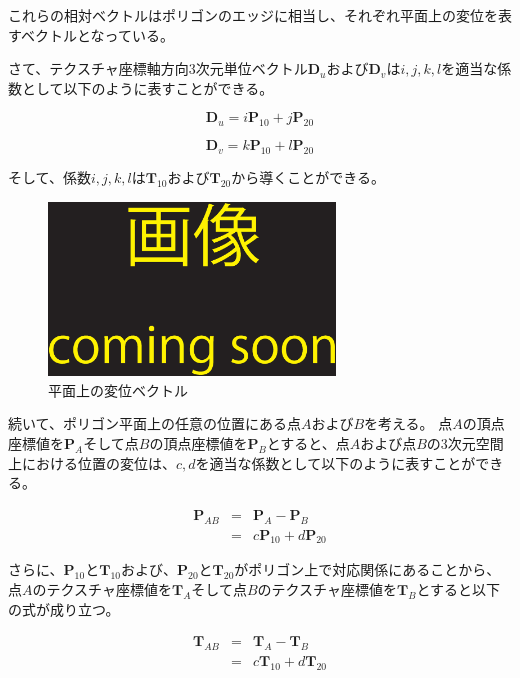 \noindent
これらの相対ベクトルはポリゴンのエッジに相当し、それぞれ平面上の変位を表すベクトルとなっている。

さて、テクスチャ座標軸方向3次元単位ベクトル$\bm{D}_u$および$\bm{D}_v$は$i,j,k,l$を適当な係数として以下のように表すことができる。

\begin{equation}
\bm{D}_u = i\bm{P}_{10} + j\bm{P}_{20}
\label{EUp}
\end{equation}

\begin{equation}
\bm{D}_v = k\bm{P}_{10} + l\bm{P}_{20}
\label{EVp}
\end{equation}

\noindent
そして、係数$i,j,k,l$は$\bm{T}_{10}$および$\bm{T}_{20}$から導くことができる。


\begin{figure}[h]
  \centering
  \includegraphics[width=3.0in]{./img/TEMP}
  \caption{平面上の変位ベクトル}
  \label{FAtoB}
\end{figure}

続いて、ポリゴン平面上の任意の位置にある点$A$および$B$を考える。
点$A$の頂点座標値を$\bm{P}_A$そして点$B$の頂点座標値を$\bm{P}_B$とすると、点$A$および点$B$の3次元空間上における位置の変位は、$c,d$を適当な係数として以下のように表すことができる。

\begin{eqnarray}
\bm{P}_{AB} &=& \bm{P}_A - \bm{P}_B\nonumber\\
           &=& c\bm{P}_{10} +  d\bm{P}_{20}  
\label{EPab}
\end{eqnarray}

\noindent
さらに、$\bm{P}_{10}$と$\bm{T}_{10}$および、$\bm{P}_{20}$と$\bm{T}_{20}$がポリゴン上で対応関係にあることから、点$A$のテクスチャ座標値を$\bm{T}_A$そして点$B$のテクスチャ座標値を$\bm{T}_B$とすると以下の式が成り立つ。

\begin{eqnarray}
\bm{T}_{AB} &=& \bm{T}_A - \bm{T}_B\nonumber\\
           &=& c\bm{T}_{10} +  d\bm{T}_{20}  
\label{ETab}
\end{eqnarray}

